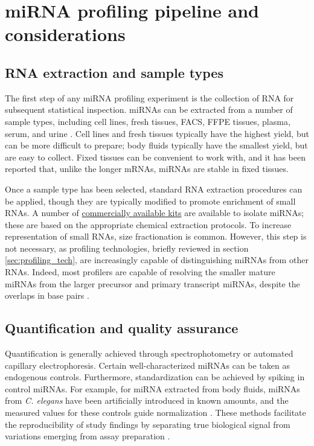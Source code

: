 \documentclass[12pt,english]{article}\usepackage{graphicx, color}
\numberwithin{equation}{section}
\numberwithin{figure}{section}
\theoremstyle{plain}
\theoremstyle{remark}
\begin{document}
\section{miRNA profiling pipeline and considerations}
\label{sec:pipeline}

\subsection{RNA extraction and sample types}

The first step of any miRNA profiling experiment is the collection of
RNA for subsequent statistical inspection. miRNAs can be extracted
from a number of sample types, including cell lines, fresh tissues,
FACS, FFPE tissues, plasma, serum, and urine
\cite{pritchard2012microrna}. Cell lines and fresh tissues typically
have the highest yield, but can be more difficult to prepare; body
fluids typically have the smallest yield, but are easy to collect.
Fixed tissues can be convenient to work with, and it has been reported
that, unlike the longer mRNAs, miRNAs are stable in fixed tissues.

Once a sample type has been selected, standard RNA extraction
procedures can be applied, though they are typically modified to
promote enrichment of small RNAs. A number of \href{https://www.google.com/search?q=miRNA+isolation+kit&oq=miRNA+isolation+kit&aqs=chrome.0.57j0l3j62l2.3401j0&sourceid=chrome&ie=UTF-8}{commercially
  available
  kits} are available to isolate miRNAs; these are based on the
appropriate chemical extraction protocols. To increase representation
of small RNAs, size fractionation is common. However, this step is
not necessary, as profiling technologies, briefly reviewed in section
\ref{sec:profiling_tech}, are increasingly capable of distinguishing
miRNAs from other RNAs. Indeed, most profilers are capable of
resolving the smaller mature miRNAs from the larger precursor and
primary transcript miRNAs, despite the overlaps in base pairs
\cite{pritchard2012microrna, kong2009strategies}.

\subsection{Quantification and quality assurance}

Quantification is generally achieved through spectrophotometry or
automated capillary electrophoresis. Certain well-characterized miRNAs
can be taken as endogenous controls. Furthermore, standardization can
be achieved by spiking in control miRNAs. For example, for miRNA
extracted from body fluids, miRNAs from \textit{C. elegans} have been
artificially introduced in known amounts, and the measured values for
these controls guide normalization \cite{kroh2010analysis}. These
methods facilitate the reproducibility of study findings by separating
true biological signal from variations emerging from assay preparation
\cite{mestdagh2009novel, peltier2008normalization}.
\end{document}
